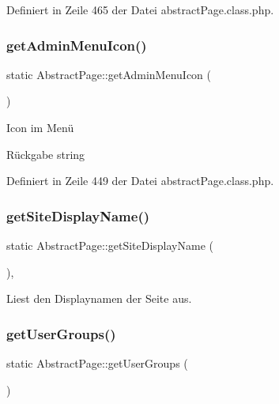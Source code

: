 Definiert in Zeile 465 der Datei abstract\+Page.\+class.\+php.

\mbox{\label{class_abstract_page_ad5c8dc342145c17bbd78f584dca6f3ce}} 
\subsubsection{\texorpdfstring{get\+Admin\+Menu\+Icon()}{getAdminMenuIcon()}}
{\footnotesize\ttfamily static Abstract\+Page\+::get\+Admin\+Menu\+Icon (\begin{DoxyParamCaption}{ }\end{DoxyParamCaption})\hspace{0.3cm}{\ttfamily [static]}}

Icon im Menü \begin{DoxyReturn}{Rückgabe}
string 
\end{DoxyReturn}


Definiert in Zeile 449 der Datei abstract\+Page.\+class.\+php.

\mbox{\label{class_abstract_page_a3c08ba2e3c97c8b7ccf62773b9251dc3}} 
\subsubsection{\texorpdfstring{get\+Site\+Display\+Name()}{getSiteDisplayName()}}
{\footnotesize\ttfamily static Abstract\+Page\+::get\+Site\+Display\+Name (\begin{DoxyParamCaption}{ }\end{DoxyParamCaption})\hspace{0.3cm}{\ttfamily [static]}, {\ttfamily [abstract]}}

Liest den Displaynamen der Seite aus. \mbox{\label{class_abstract_page_a64fcf7befc43ac71bbdd646604592c73}} 
\subsubsection{\texorpdfstring{get\+User\+Groups()}{getUserGroups()}}
{\footnotesize\ttfamily static Abstract\+Page\+::get\+User\+Groups (\begin{DoxyParamCaption}{ }\end{DoxyParamCaption})\hspace{0.3cm}{\ttfamily [static]}}

